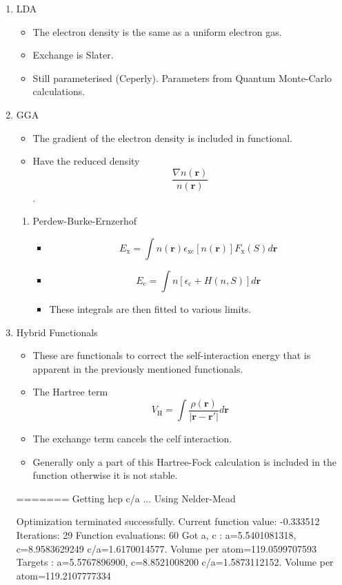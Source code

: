 \documentclass[11pt]{article}
\begin{document}
\begin{enumerate}
\item LDA
\label{sec:org6d3f500}
\begin{itemize}
\item The electron density is the same as a uniform electron gas.
\item Exchange is Slater.
\item Still parameterised (Ceperly). Parameters from Quantum Monte-Carlo
calculations.
\end{itemize}

\item GGA
\label{sec:orge9d616e}
\begin{itemize}
\item The gradient of the electron density is included in functional.
\item Have the reduced density \[ \frac{ \nabla n(\mathbf{r})}{n( \mathbf{r}
       )}\].
\end{itemize}
\begin{enumerate}
\item Perdew-Burke-Ernzerhof
\label{sec:org3f532a3}
\begin{itemize}
\item \[ E_{\text{x}} = \int n( \mathbf{r} ) \epsilon_{\text{xc}}[n( \mathbf{r}
        )] F_{\text{x}}(S)d\mathbf{r} \]
\item \[ E_{\text{c}} = \int n[ \epsilon_{\text{c}} + H(n,S) ]d\mathbf{r} \]
\item These integrals are then fitted to various limits.
\end{itemize}
\end{enumerate}

\item Hybrid Functionals
\label{sec:org5527776}
\begin{itemize}
\item These are functionals to correct the self-interaction energy that is
apparent in the previously mentioned functionals.
\item The Hartree term \[V_{\text{H}}=\int \frac{\rho(\mathbf{r})}{|\mathbf{r} - \mathbf{r}'|} d\mathbf{r}  \]
\item The exchange term cancels the celf interaction.
\item Generally only a part of this Hartree-Fock calculation is included in
the function otherwise it is not stable.
\end{itemize}
=======
Getting hcp c/a ...
Using Nelder-Mead

Optimization terminated successfully.
	 Current function value: -0.333512
	 Iterations: 29
	 Function evaluations: 60
Got a, c : a=5.5401081318, c=8.9583629249 c/a=1.6170014577. Volume per atom=119.0599707593
Targets  : a=5.5767896900, c=8.8521008200 c/a=1.5873112152. Volume per atom=119.2107777334


\end{enumerate}
\end{document}
